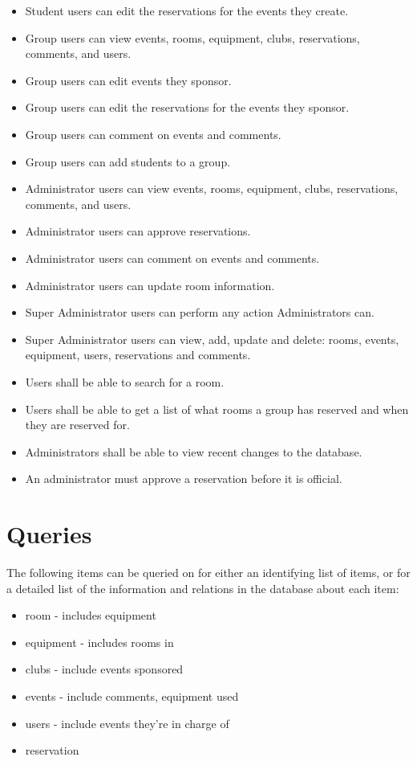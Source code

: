 \documentclass{article}
\begin{document}
\begin{itemize}
\item Student users can edit the reservations for the events they create.
\item Group users can view events, rooms, equipment, clubs, reservations, comments, and users.
\item Group users can edit events they sponsor.
\item Group users can edit the reservations for the events they sponsor.
\item Group users can comment on events and comments.
\item Group users can add students to a group.
\item Administrator users can view events, rooms, equipment, clubs, reservations, comments, and users.
\item Administrator users can approve reservations.
\item Administrator users can comment on events and comments.
\item Administrator users can update room information.
\item Super Administrator users can perform any action Administrators can.
\item Super Administrator users can view, add, update and delete: rooms, events, equipment, users, reservations and comments.
\item Users shall be able to search for a room.
\item Users shall be able to get a list of what rooms a group has
reserved and when they are reserved for.
\item Administrators shall be able to view recent changes to the database.
\item An administrator must approve a reservation before it is official.
\end{itemize}

\section{}

\section{Queries}

The following items can be queried on for either an identifying list of items,
or for a detailed list of the information and relations in the database about each item:
\begin{itemize}
\item room - includes equipment
\item equipment - includes rooms in
\item clubs - include events sponsored 
\item events - include comments, equipment used
\item users - include events they're in charge of
\item reservation 
\end{itemize}
\end{document}
